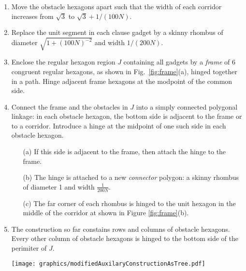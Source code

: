 \documentclass[10pt]{CSUNthesis}
\theoremstyle{plain}%
\theoremstyle{definition}
\theoremstyle{remark}
\newcommand{\lr}[1]{\left( #1 \right)}
\begin{document}
\begin{enumerate}
\item Move the obstacle hexagons apart such that the width of each corridor increases from $\sqrt{3}$ to $\sqrt{3}+1/(100N)$.
\item Replace the unit segment in each clause gadget by a skinny rhombus of diameter $\sqrt{1 + \lr{100N}^{-2}}$ and width $1/(200N)$.
\item Enclose the regular hexagon region $J$ containing all gadgets by a \emph{frame} of 6 congruent regular hexagons, as shown in Fig.~\ref{fig:frame}(a), hinged together in a path. Hinge adjacent frame hexagons at the modpoint of the common side.
\item Connect the frame and the obstacles in $J$ into a simply connected polygonal linkage: in each obstacle
hexagon, the bottom side is adjacent to the frame or to a corridor.
Introduce a hinge at the midpoint of one such side in each obstacle hexagon.
\begin{itemize}
	\item[(a)] If this side is adjacent to the frame, then attach the hinge to the frame. 
	\item[(b)] The hinge is attached to a new \emph{connector} polygon: a skinny rhombus of diameter 1 and width $\frac{1}{200N}$.
	\item[(c)] The far corner of each rhombus is hinged to the unit hexagon in the middle of the corridor at shown in Figure \ref{fig:frame}(b).
\end{itemize} 
\item The construction so far constains rows and columns of obstacle hexagons.
Every other column of obstacle hexagons is hinged to the bottom side of the perimiter of $J$.

\begin{minipage}{\linewidth}
\begin{center}
\texttt{[image: graphics/modifiedAuxilaryConstructionAsTree.pdf]}
\label{fig:modifiedAuxilaryConstructionAsTree.pdf}
\end{center}
\end{minipage}


\end{enumerate}
\end{document}
